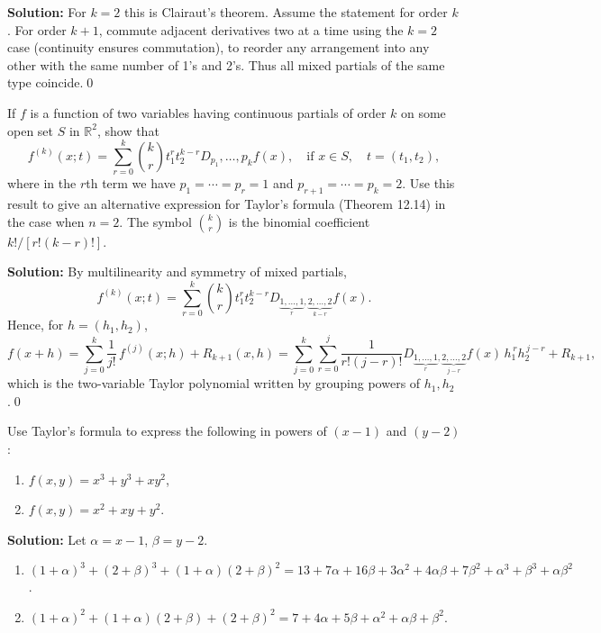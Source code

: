 \noindent\textbf{Solution:}
For $k=2$ this is Clairaut's theorem. Assume the statement for order $k$. For order $k+1$, commute adjacent derivatives two at a time using the $k=2$ case (continuity ensures commutation), to reorder any arrangement into any other with the same number of 1's and 2's. Thus all mixed partials of the same type coincide.\qed


\begin{problembox}
If \( f \) is a function of two variables having continuous partials of order \( k \) on some open set \( S \) in \( \mathbb{R}^2 \), show that
\[f^{(k)} (x; t) = \sum_{r=0}^{k} \binom{k}{r} t_1^r t_2^{k-r} D_{p_1}, \ldots, p_k f(x), \quad \text{if } x \in S, \quad t = (t_1, t_2),\]
where in the \( r \)th term we have \( p_1 = \cdots = p_r = 1 \) and \( p_{r+1} = \cdots = p_k = 2 \). Use this result to give an alternative expression for Taylor's formula (Theorem 12.14) in the case when \( n = 2 \). The symbol \( \binom{k}{r} \) is the binomial coefficient \( k! / [r! (k - r)!] \).
\end{problembox}

\noindent\textbf{Solution:}
By multilinearity and symmetry of mixed partials,
\[f^{(k)}(x;t)=\sum_{r=0}^k \binom{k}{r} t_1^r t_2^{k-r} D_{\underbrace{1,\dots,1}_{r},\underbrace{2,\dots,2}_{k-r}} f(x).\]
Hence, for $h=(h_1,h_2)$,
\[f(x+h)=\sum_{j=0}^k \frac{1}{j!}\,f^{(j)}(x;h)+R_{k+1}(x,h)=\sum_{j=0}^k\sum_{r=0}^j \frac{1}{r!(j-r)!} D_{\!\underbrace{1,\dots,1}_{r},\underbrace{2,\dots,2}_{j-r}} f(x)\,h_1^{\,r} h_2^{\,j-r}+R_{k+1},\]
which is the two-variable Taylor polynomial written by grouping powers of $h_1,h_2$.\qed


\begin{problembox}
Use Taylor's formula to express the following in powers of \( (x - 1) \) and \( (y - 2) \):
\begin{enumerate}[label=(\alph*)]
\item \( f(x, y) = x^3 + y^3 + xy^2 \),
\item \( f(x, y) = x^2 + xy + y^2 \).
\end{enumerate}
\end{problembox}

\noindent\textbf{Solution:}
Let $\alpha=x-1$, $\beta=y-2$.
\begin{enumerate}[label=(\alph*)]
\item $(1+\alpha)^3+(2+\beta)^3+(1+\alpha)(2+\beta)^2=13+7\alpha+16\beta+3\alpha^2+4\alpha\beta+7\beta^2+\alpha^3+\beta^3+\alpha\beta^2$.
\item $(1+\alpha)^2+(1+\alpha)(2+\beta)+(2+\beta)^2=7+4\alpha+5\beta+\alpha^2+\alpha\beta+\beta^2$.
\end{enumerate}